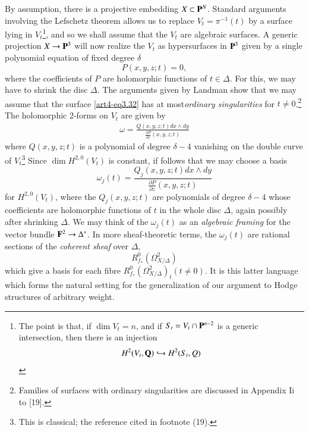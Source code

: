 By assumption, there is a projective embedding $X \subset \mathbf{P}^N$. Standard arguments involving the Lefschetz theorem allows us to replace $V_t = \pi^{-1} (t)$ by a surface lying in $V_t$\footnote[18]{The point is that, if $\dim V_t=n$, and if $S_t = V_t \cap \mathbf{P}^{n-2}$ is a generic intersection, then there is an injection
$$
H^2 (V_t, \mathbf{Q}) \hookrightarrow H^2 (S_t, Q)
$$}, and so we shall assume that the $V_t$ are algebraic surfaces. A generic projection $X \to \mathbf{P}^3$ will now realize the $V_t$ as hypersurfaces in $\mathbf{P}^3$ given by a  single polynomial equation of fixed degree $\delta$
\setcounter{equation}{31}
\begin{equation}
P(x, y, z; t) = 0, 
\label{art4-eq3.32}
\end{equation}
where the coefficients of $P$ are holomorphic functions of $t \in \Delta$. For this, we may have to shrink the disc $\Delta$. The arguments given by Landman \cite{art4-key35} show that we may assume that the surface \eqref{art4-eq3.32} has at most\pageoriginale \textit{ordinary singularities} for $t \neq 0$.\footnote[19]{Families of surfaces with ordinary singularities are discussed in Appendix Ii to [19].} The holomorphic 2-forms on $V_t$ are given by 
\begin{align*}
\omega = \frac{Q (x, y, z; t) dx \wedge dy}{\frac{\partial P}{\partial x} (x, y, z ; t)}
\end{align*}
where $Q (x, y, z ; t)$ is a polynomial of degree $\delta - 4$ vanishing on the double curve of $V_t$\footnote[20]{This is classical; \cf the reference cited in footnote (19).} Since $\dim H^{2,0} (V_t)$ is constant, if follows that we may choose a basis
\begin{equation}
\omega_j (t) = \frac{Q_j (x, y, z; t ) dx \wedge dy}{\frac{\partial P}{\partial z} (x, y, z ; t)}
\label{art4-eq3.33}
\end{equation}
for $H^{2,0} (V_t)$, where the $Q_j (x, y, z; t)$ are polynomials of degree $\delta - 4$ whose coefficients are holomorphic functions of $t$ in the whole disc $\Delta$, again possibly after shrinking $\Delta$. We may think of the $\omega_j(t)$ as an \textit{algebraic framing} for the vector bundle $\mathbf{F}^2 \to \Delta^\ast$. In more sheaf-theoretic terms, the $\omega_j (t)$ are rational sections of the \textit{coherent sheaf} over $\Delta$,
$$
R^0_{f_\ast} (\Omega^2_{X/\Delta})
$$
which give a basis for each fibre $R^0_{f_\ast} (\Omega^2_{X/\Delta})_t (t \neq 0)$. It is this latter language which forms the natural setting for the generalization of our argument to Hodge structures of arbitrary weight.

